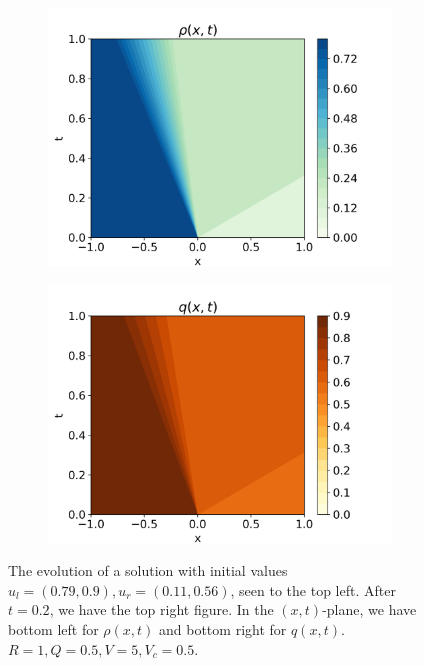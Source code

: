 \documentclass[10pt]{article}
\numberwithin{equation}{section}
\begin{document}
\begin{figure}[H]
\begin{subfigure}[b]{0.35\textwidth}
         \includegraphics[width=\textwidth]{Figures/Model/Plots/Sys1aRho.png}
     \end{subfigure}
     \begin{subfigure}[b]{0.35\textwidth}
         \centering
         \includegraphics[width=\textwidth]{Figures/Model/Plots/Sys1aQ.png}
     \end{subfigure}
        \caption{The evolution of a solution with initial values $u_l = (0.79, 0.9), u_r = (0.11, 0.56)$, seen to the top left. After $t = 0.2$, we have the top right figure. In the $(x,t)$-plane, we have bottom left for $\rho(x,t)$ and bottom right for $q(x,t)$. $R = 1, Q = 0.5, V = 5, V_c = 0.5$.}
        \label{fig:Example1a}
\end{figure} \begin{figure}[H]

\end{figure}
\end{document}
